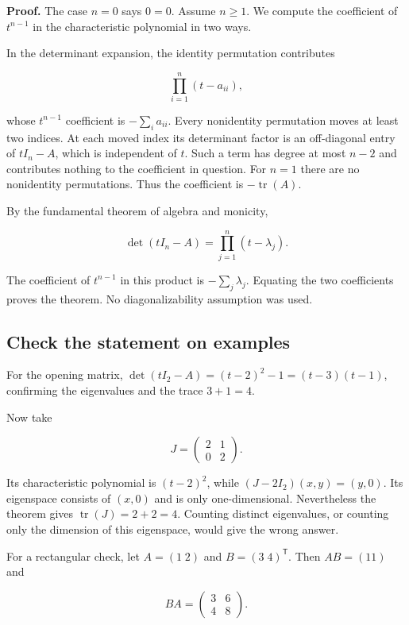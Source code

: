 \textbf{Proof.} The case \(n=0\) says \(0=0\). Assume \(n\geq1\). We compute the coefficient of \(t^{n-1}\) in the characteristic polynomial in two ways.

In the determinant expansion, the identity permutation contributes

\[
\prod_{i=1}^{n}(t-a_{ii}),
\]

whose \(t^{n-1}\) coefficient is \(-\sum_i a_{ii}\). Every nonidentity permutation moves at least two indices. At each moved index its determinant factor is an off-diagonal entry of \(tI_n-A\), which is independent of \(t\). Such a term has degree at most \(n-2\) and contributes nothing to the coefficient in question. For \(n=1\) there are no nonidentity permutations. Thus the coefficient is \(-\operatorname{tr}(A)\).

By the fundamental theorem of algebra and monicity,

\[
\det(tI_n-A)=\prod_{j=1}^{n}(t-\lambda_j).
\]

The coefficient of \(t^{n-1}\) in this product is \(-\sum_j\lambda_j\). Equating the two coefficients proves the theorem. No diagonalizability assumption was used.

\subsection{Check the statement on examples}\label{check-the-statement-on-examples}

For the opening matrix, \(\det(tI_2-A)=(t-2)^2-1=(t-3)(t-1)\), confirming the eigenvalues and the trace \(3+1=4\).

Now take

\[
J=\begin{pmatrix}2&1\\0&2\end{pmatrix}.
\]

Its characteristic polynomial is \((t-2)^2\), while \((J-2I_2)(x,y)=(y,0)\). Its eigenspace consists of \((x,0)\) and is only one-dimensional. Nevertheless the theorem gives \(\operatorname{tr}(J)=2+2=4\). Counting distinct eigenvalues, or counting only the dimension of this eigenspace, would give the wrong answer.

For a rectangular check, let \(A=(1\;2)\) and \(B=(3\;4)^{\mathsf T}\). Then \(AB=(11)\) and

\[
BA=\begin{pmatrix}3&6\\4&8\end{pmatrix}.
\]

